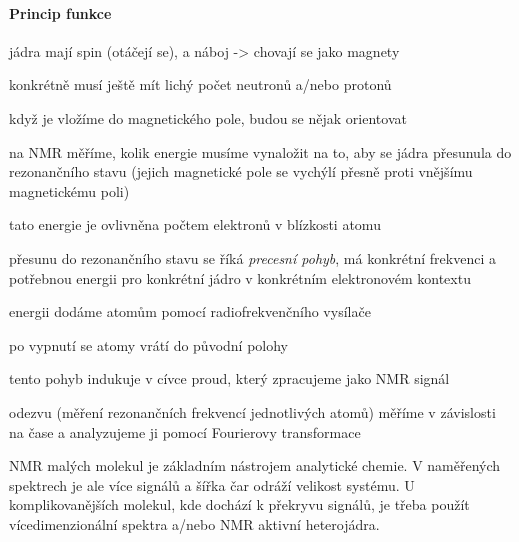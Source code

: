 \documentclass[DIV=8]{scrreprt}
\begin{document}
\paragraph{Princip funkce}
\begin{myItemize}[nosep]
    \item jádra mají spin (otáčejí se), a náboj -> chovají se jako magnety
\begin{myItemize}[nosep]
    \item konkrétně musí ještě mít lichý počet neutronů a/nebo protonů
    \item když je vložíme do magnetického pole, budou se nějak orientovat
\end{myItemize}

    \item na NMR měříme, kolik energie musíme vynaložit na to, aby se jádra přesunula do rezonančního stavu (jejich magnetické pole se vychýlí přesně proti vnějšímu magnetickému poli)
\begin{myItemize}[nosep]
    \item tato energie je ovlivněna počtem elektronů v blízkosti atomu
    \item přesunu do rezonančního stavu se říká \emph{precesní pohyb}, má konkrétní frekvenci a potřebnou energii pro konkrétní jádro v konkrétním elektronovém kontextu
\end{myItemize}

    \item energii dodáme atomům pomocí radiofrekvenčního vysílače
\begin{myItemize}[nosep]
    \item po vypnutí se atomy vrátí do původní polohy
    \item tento pohyb indukuje v cívce proud, který zpracujeme jako NMR signál
\end{myItemize}

    \item odezvu (měření rezonančních frekvencí jednotlivých atomů) měříme v závislosti na čase a analyzujeme ji pomocí Fourierovy transformace
\end{myItemize}



NMR malých molekul je základním nástrojem analytické chemie. V naměřených spektrech je ale více signálů a šířka čar odráží velikost systému. U komplikovanějších molekul, kde dochází k překryvu signálů, je třeba použít vícedimenzionální spektra a/nebo NMR aktivní heterojádra.
\end{document}
